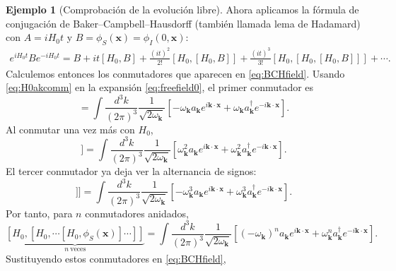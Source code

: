 \documentclass[11pt,letterpaper]{article}
\theoremstyle{definition}
\theoremstyle{definition}
\newtheorem{ejemplo}{Ejemplo}
\begin{document}
\begin{ejemplo}[Comprobación de la evolución libre]
Ahora aplicamos la fórmula de conjugación de Baker--Campbell--Hausdorff
(también llamada lema de Hadamard) con
$A=iH_0t$ y $B=\phi_S(\mathbf{x})=\phi_I(0,\mathbf{x})$:
\begin{equation}
  \boxed{\begin{gathered}\textstyle
  e^{iH_0t}B e^{-iH_0t}
  =
  B+it[H_0,B]
  +\frac{(it)^2}{2!}[H_0,[H_0,B]]
  +\frac{(it)^3}{3!}[H_0,[H_0,[H_0,B]]]+\cdots .
  \end{gathered}}
  \label{eq:BCHfield}
\end{equation}
Calculemos entonces los conmutadores que aparecen en \eqref{eq:BCHfield}.
Usando \eqref{eq:H0akcomm} en la expansión \eqref{eq:freefield0}, el primer
conmutador es
\begin{equation}
  [H_0,\phi_S(\mathbf{x})]
  =
  \int\frac{d^3k}{(2\pi)^3}
  \frac{1}{\sqrt{2\omega_{\mathbf{k}}}}
  \left[
    -\omega_{\mathbf{k}}a_{\mathbf{k}}e^{i\mathbf{k}\cdot\mathbf{x}}
    +\omega_{\mathbf{k}}a_{\mathbf{k}}^\dagger e^{-i\mathbf{k}\cdot\mathbf{x}}
  \right].
  \label{eq:firstPhiComm}
\end{equation}
Al conmutar una vez más con \(H_0\),
\begin{equation}
  [H_0,[H_0,\phi_S(\mathbf{x})]]
  =
  \int\frac{d^3k}{(2\pi)^3}
  \frac{1}{\sqrt{2\omega_{\mathbf{k}}}}
  \left[
    \omega_{\mathbf{k}}^2a_{\mathbf{k}}e^{i\mathbf{k}\cdot\mathbf{x}}
    +\omega_{\mathbf{k}}^2a_{\mathbf{k}}^\dagger e^{-i\mathbf{k}\cdot\mathbf{x}}
  \right].
  \label{eq:secondPhiComm}
\end{equation}
El tercer conmutador ya deja ver la alternancia de signos:
\begin{equation}
  [H_0,[H_0,[H_0,\phi_S(\mathbf{x})]]]
  =
  \int\frac{d^3k}{(2\pi)^3}
  \frac{1}{\sqrt{2\omega_{\mathbf{k}}}}
  \left[
    -\omega_{\mathbf{k}}^3a_{\mathbf{k}}e^{i\mathbf{k}\cdot\mathbf{x}}
    +\omega_{\mathbf{k}}^3a_{\mathbf{k}}^\dagger e^{-i\mathbf{k}\cdot\mathbf{x}}
  \right].
  \label{eq:thirdPhiComm}
\end{equation}
Por tanto, para \(n\) conmutadores anidados,
\begin{equation}
  \underbrace{[H_0,[H_0,\cdots[H_0,\phi_S(\mathbf{x})]\cdots]]}_{n\ \text{veces}}
  =
  \int\frac{d^3k}{(2\pi)^3}
  \frac{1}{\sqrt{2\omega_{\mathbf{k}}}}
  \left[
    (-\omega_{\mathbf{k}})^n
    a_{\mathbf{k}}e^{i\mathbf{k}\cdot\mathbf{x}}
    +\omega_{\mathbf{k}}^n
    a_{\mathbf{k}}^\dagger e^{-i\mathbf{k}\cdot\mathbf{x}}
  \right].
  \label{eq:nestedPhiComm}
\end{equation}
Sustituyendo estos conmutadores en \eqref{eq:BCHfield},

\end{ejemplo}
\end{document}
